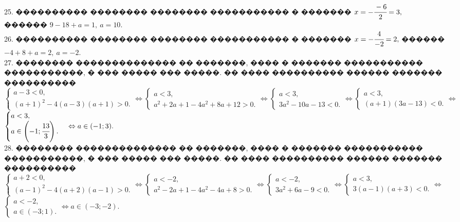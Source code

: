 \documentclass[12pt]{article}
\begin{document}
25. ���������� �������� �������� ����������� � ������� $x=-\cfrac{-6}{2}=3,$ ������ $9-18+a=1,\ a=10.$\\
26. ���������� �������� �������� ����������� � ������� $x=-\cfrac{4}{-2}=2,$ ������ $-4+8+a=2,\ a=-2.$\\
27. �������� �������������� �� �������, ���� � ������� ����������� �����������, � ��� ����� ��� �����. �� ���� ���������� ������ ������� ���������� $\begin{cases} a-3<0,\\ (a+1)^2-4(a-3)(a+1)>0.\end{cases}\Leftrightarrow\begin{cases} a<3,\\ a^2+2a+1-4a^2+8a+12>0.\end{cases}\Leftrightarrow
\begin{cases} a<3,\\ 3a^2-10a-13<0.\end{cases}\Leftrightarrow\begin{cases} a<3,\\ (a+1)(3a-13)<0.\end{cases}\Leftrightarrow$\\$
\begin{cases} a<3,\\ a\in\left(-1;\cfrac{13}{3}\right).\end{cases}\Leftrightarrow a\in(-1;3).$\\
28. �������� �������������� �� �������, ���� � ������� ����������� �����������, � ��� ����� ��� �����. �� ���� ���������� ������ ������� ���������� $\begin{cases} a+2<0,\\ (a-1)^2-4(a+2)(a-1)>0.\end{cases}\Leftrightarrow\begin{cases} a<-2,\\ a^2-2a+1-4a^2-4a+8>0.\end{cases}\Leftrightarrow
\begin{cases} a<-2,\\ 3a^2+6a-9<0.\end{cases}\Leftrightarrow\begin{cases} a<3,\\ 3(a-1)(a+3)<0.\end{cases}\Leftrightarrow$\\$
\begin{cases} a<-2,\\ a\in\left(-3;1\right).\end{cases}\Leftrightarrow a\in(-3;-2).$\\
\end{document}

